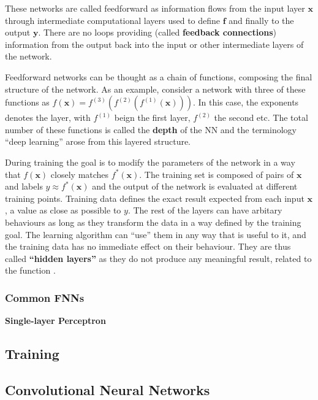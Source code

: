 These networks are called feedforward as information flows from the input layer
$\bm{x}$ through intermediate computational layers used to define $\bm{f}$ and
finally to the output $\bm{y}$. There are no loops providing (called
\textbf{feedback connections}) information from the output back into
the input or other intermediate layers of the network.

Feedforward networks can be thought as a chain of functions, composing
the final structure of the network. As an example, consider a network
with three of these functions as $f(\bm{x}) = f^{(3)}(f^{(2)}(f^{(1)}(\bm{x})))$.
In this case, the exponents denotes the layer, with $f^{(1)}$ beign the first
layer, $f^{(2)}$ the second etc. The total number of these functions is called
the \textbf{depth} of the NN and the terminology ``deep learning'' arose from
this layered structure.

During training the goal is to modify the parameters of the
network in a way that $f(\bm{x})$ closely matches $f^*(\bm{x})$. The training
set is composed of pairs of $\bm{x}$ and labels $y \approx f^*(\bm{x})$ and
the output of the network is evaluated at different training points. Training
data defines the exact result expected from each input $\bm{x}$, a value as close
as possible to $y$. The rest of the layers can have arbitary behaviours as long
as they transform the data in a way defined by the training goal. The
learning algorithm can ``use'' them in any way that is useful to it, and
the training data has no immediate effect on their behaviour. They are
thus called \textbf{``hidden layers''} as they do not produce any
meaningful result, related to the function \cite[p.~160]{book:Goodfellow}. 

\subsubsection*{Common FNNs}

\textbf{Single-layer Perceptron} 


\subsection{Training}



\newpage
\subsection{Convolutional Neural Networks}
\newpage

